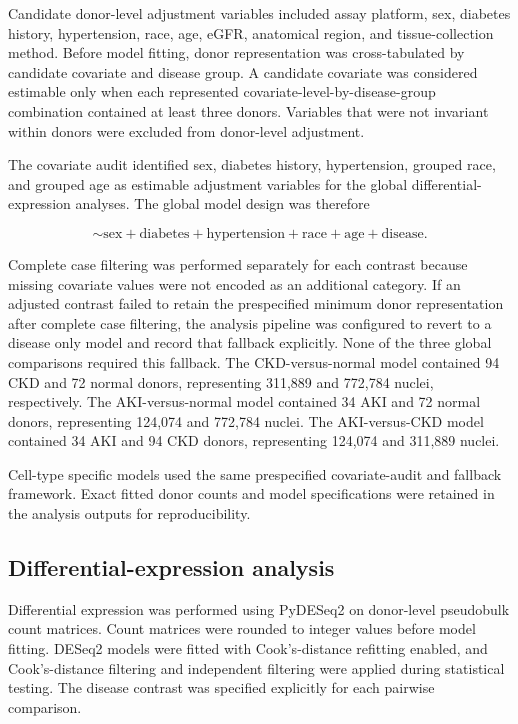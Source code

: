 \documentclass[10pt,letterpaper]{article}
\begin{document}
Candidate donor-level adjustment variables included assay platform, sex, diabetes history, hypertension, race, age, eGFR, anatomical region, and tissue-collection method. Before model fitting, donor representation was cross-tabulated by candidate covariate and disease group. A candidate covariate was considered estimable only when each represented covariate-level-by-disease-group combination contained at least three donors. Variables that were not invariant within donors were excluded from donor-level adjustment.

The covariate audit identified sex, diabetes history, hypertension, grouped race, and grouped age as estimable adjustment variables for the global differential-expression analyses. The global model design was therefore

$$
\sim \mathrm{sex}
+ \mathrm{diabetes}
+ \mathrm{hypertension}
+ \mathrm{race}
+ \mathrm{age}
+ \mathrm{disease}.
$$

Complete case filtering was performed separately for each contrast because missing covariate values were not encoded as an additional category. If an adjusted contrast failed to retain the prespecified minimum donor representation after complete case filtering, the analysis pipeline was configured to revert to a disease only model and record that fallback explicitly. None of the three global comparisons required this fallback. The CKD-versus-normal model contained 94 CKD and 72 normal donors, representing 311,889 and 772,784 nuclei, respectively. The AKI-versus-normal model contained 34 AKI and 72 normal donors, representing 124,074 and 772,784 nuclei. The AKI-versus-CKD model contained 34 AKI and 94 CKD donors, representing 124,074 and 311,889 nuclei.

Cell-type specific models used the same prespecified covariate-audit and fallback framework. Exact fitted donor counts and model specifications were retained in the analysis outputs for reproducibility.

\subsection*{Differential-expression analysis}

Differential expression was performed using PyDESeq2 \cite{muzellec2023pydeseq2} on donor-level pseudobulk count matrices. Count matrices were rounded to integer values before model fitting. DESeq2 models were fitted with Cook's-distance refitting enabled, and Cook's-distance filtering and independent filtering were applied during statistical testing. The disease contrast was specified explicitly for each pairwise comparison.
\end{document}
